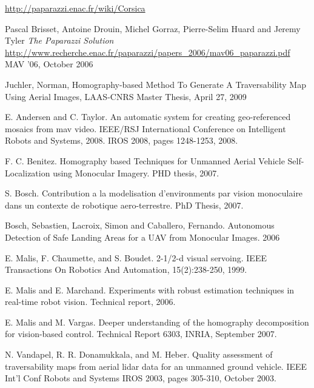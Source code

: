 \documentclass[a4paper,11pt]{report}
\begin{document}
\begin{thebibliography}{9}
  \url{http://paparazzi.enac.fr/wiki/Corsica}


  Pascal Brisset, Antoine Drouin, Michel Gorraz, Pierre-Selim Huard and Jeremy Tyler
  \emph{The Paparazzi Solution}
  \url{http://www.recherche.enac.fr/paparazzi/papers_2006/mav06_paparazzi.pdf}
  MAV '06,
  October 2006


Juchler, Norman, Homography-based Method To Generate A Traversability Map Using Aerial Images, LAAS-CNRS Master Thesis, April 27, 2009

E. Andersen and C. Taylor. An automatic system for creating geo-referenced mosaics from mav video.  IEEE/RSJ International Conference on Intelligent Robots and Systems, 2008. IROS 2008, pages 1248-1253, 2008.

F. C. Benitez. Homography based Techniques for Unmanned Aerial Vehicle Self-Localization using Monocular Imagery. PHD thesis, 2007.

S. Bosch. Contribution a la modelisation d'environments par vision monoculaire dans un contexte de robotique aero-terrestre. PhD Thesis, 2007.

Bosch, Sebastien, Lacroix, Simon and Caballero, Fernando. Autonomous Detection of Safe Landing Areas for a UAV from Monocular Images. 2006

E. Malis, F. Chaumette, and S. Boudet. 2-1/2-d visual servoing. IEEE Transactions On Robotics And Automation, 15(2):238-250, 1999.

E. Malis and E. Marchand. Experiments with robust estimation techniques in real-time robot vision. Technical report, 2006.

E. Malis and M. Vargas. Deeper understanding of the homography decomposition for vision-based control. Technical Report 6303, INRIA, September 2007.

N. Vandapel, R. R. Donamukkala, and M. Heber. Quality assessment of traversability maps from aerial lidar data for an unmanned ground vehicle. IEEE Int'l Conf Robots and Systems IROS 2003, pages 305-310, October 2003.

\end{thebibliography}
\end{document}
